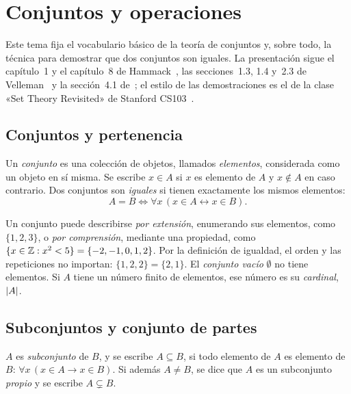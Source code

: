 \chapter{Conjuntos y operaciones}
\label{tema:1}

Este tema fija el vocabulario básico de la teoría de conjuntos y, sobre todo, la técnica para demostrar que dos conjuntos son iguales. La presentación sigue el capítulo~1 y el capítulo~8 de Hammack~\cite{hammack}, las secciones~1.3, 1.4 y~2.3 de Velleman~\cite{velleman} y la sección~4.1 de~\cite{mcs}; el estilo de las demostraciones es el de la clase «Set Theory Revisited» de Stanford CS103~\cite{cs103set}.

\section{Conjuntos y pertenencia}

\begin{definicion}[Conjunto]
Un \emph{conjunto} es una colección de objetos, llamados \emph{elementos}, considerada como un objeto en sí misma. Se escribe $x\in A$ si $x$ es elemento de $A$ y $x\notin A$ en caso contrario. Dos conjuntos son \emph{iguales} si tienen exactamente los mismos elementos:
\[
A=B\iff \forall x\,(x\in A\leftrightarrow x\in B).
\]
\end{definicion}

Un conjunto puede describirse \emph{por extensión}, enumerando sus elementos, como $\{1,2,3\}$, o \emph{por comprensión}, mediante una propiedad, como $\{x\in\mathbb{Z} : x^{2}<5\}=\{-2,-1,0,1,2\}$. Por la definición de igualdad, el orden y las repeticiones no importan: $\{1,2,2\}=\{2,1\}$. El \emph{conjunto vacío} $\emptyset$ no tiene elementos. Si $A$ tiene un número finito de elementos, ese número es su \emph{cardinal}, $\lvert A\rvert$.

\addtocounter{definicion}{1}%

\section{Subconjuntos y conjunto de partes}

\begin{definicion}[Subconjunto]
$A$ es \emph{subconjunto} de $B$, y se escribe $A\subseteq B$, si todo elemento de $A$ es elemento de $B$: $\forall x\,(x\in A\rightarrow x\in B)$. Si además $A\neq B$, se dice que $A$ es un subconjunto \emph{propio} y se escribe $A\subsetneq B$.
\end{definicion}


